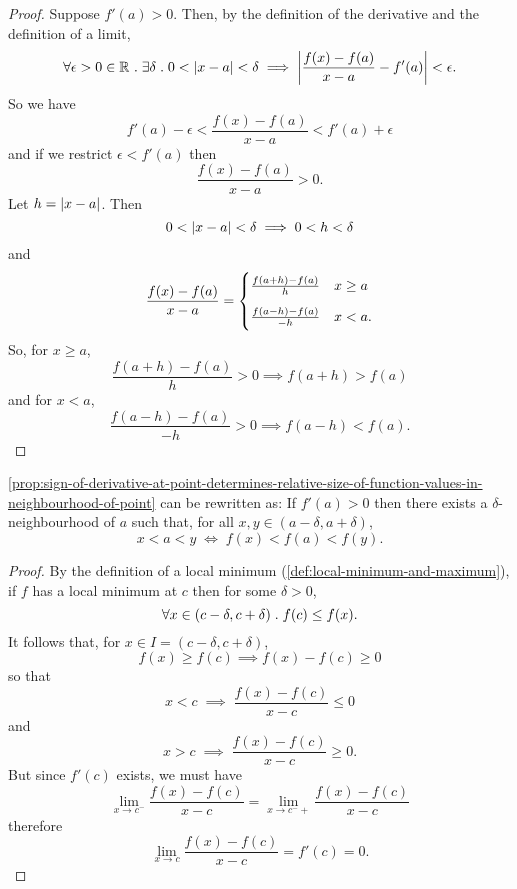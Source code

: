 \documentclass[../MathsNotesBase.tex]{subfiles}
\begin{document}
{	
		\nl[8]
		\begin{proof}
			Suppose ${ f'(a) > 0 }$. Then, by the definition of the derivative and the definition of a limit,
			\[ \forall \epsilon > 0 \in \mathbb{R}^{} \;.\; \exists \delta \;.\; 0 < \left\lvert x - a\right\rvert < \delta \implies \left\lvert\frac{f(x) - f(a)}{x - a} - f'(a)\right\rvert < \epsilon. \]
			So we have
			\[ f'(a) - \epsilon < \frac{f(x) - f(a)}{x - a} < f'(a) + \epsilon \]
			and if we restrict ${ \epsilon < f'(a) }$ then
			\[ \frac{f(x) - f(a)}{x - a} > 0. \]
			Let ${ h = \left\lvert x - a\right\rvert }$. Then
			\[ 0 < \left\lvert x - a\right\rvert < \delta \implies 0 < h < \delta \]
			and
			\[ 
				\frac{f(x) - f(a)}{x - a} = \begin{cases}
												\frac{f(a + h) - f(a)}{h}  & x \geq a \nnn
												\frac{f(a - h) - f(a)}{-h}  & x < a.
											\end{cases}
			\]
			So, for ${ x \geq a }$,
			\[ \frac{f(a + h) - f(a)}{h} > 0 \implies f(a + h) > f(a) \]
			and for ${ x < a }$,
			\[ \frac{f(a - h) - f(a)}{-h} > 0 \implies f(a - h) < f(a). \]
		\end{proof}
		\begin{corollary}\label{coro:sign-of-derivative-at-point-determines-relative-size-of-function-values-in-neighbourhood-of-point}
			\autoref{prop:sign-of-derivative-at-point-determines-relative-size-of-function-values-in-neighbourhood-of-point} can be rewritten as: If ${ f'(a) > 0 }$ then there exists a $\delta$-neighbourhood of $a$ such that, for all ${ x,y \in (a - \delta, a + \delta) }$,
			\[ x < a < y \; \iff \; f(x) < f(a) < f(y). \]
		\end{corollary}
	
		
		\nl[8]
		\begin{proof}
			By the definition of a local minimum (\ref{def:local-minimum-and-maximum}), if $f$ has a local minimum at $c$ then for some ${ \delta > 0 }$,
			\[ \forall x \in (c - \delta, c + \delta) \;.\; f(c) \leq f(x). \]
			It follows that, for ${ x \in I = (c - \delta, c + \delta) }$,
			\[ f(x) \geq f(c) \implies f(x) - f(c) \geq 0 \]
			so that
			\[ x < c \; \implies \; \frac{f(x) - f(c)}{x - c} \leq 0 \]
			and
			\[ x > c \; \implies \; \frac{f(x) - f(c)}{x - c} \geq 0. \]
			But since $f'(c)$ exists, we must have
			\[ \lim_{x \to c^-} \frac{f(x) - f(c)}{x - c} = \lim_{x \to c^-+} \frac{f(x) - f(c)}{x - c} \]
			therefore
			\[ \lim_{x \to c} \frac{f(x) - f(c)}{x - c} = f'(c) = 0. \]
			

\end{proof}}
\end{document}
